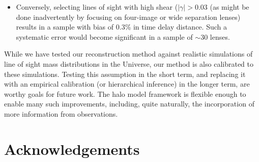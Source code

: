 \documentclass[useAMS,usenatbib]{mn2e}
\begin{document}
\begin{itemize}
\item Conversely, selecting lines of sight with high shear ($|\gamma| >
0.03$ (as might be done inadvertently by focusing on four-image or wide
separation lenses) results in a sample with bias of 0.3\% in time delay
distance. Such a systematic error would become significant in a sample of $\sim$30 lenses. 


\end{itemize}





While we have tested our reconstruction method against realistic simulations
of line of sight mass distributions in the Universe, our method is also 
calibrated to these simulations. Testing this assumption in the short term,
and replacing it with an empirical calibration (or hierarchical inference) in
the longer term, are worthy goals for future work. The halo model framework is
flexible enough to enable many such improvements, including, quite naturally,
the incorporation of more information from observations. 



\section*{Acknowledgements}
 
\end{document}

